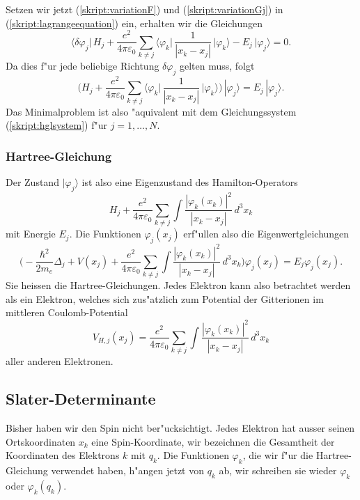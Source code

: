 Setzen wir jetzt (\ref{skript:variationF}) und (\ref{skript:variationGj})
in (\ref{skript:lagrangeequation}) ein, erhalten wir die Gleichungen
\[
\biggl\langle
\delta\varphi_j\biggl|\,
H_j
+
\frac{e^2}{4\pi\varepsilon_0}
\sum_{k\ne j}\biggl\langle\varphi_k\biggl|\,
\frac1{|x_k-x_j|}
\,\biggr|\varphi_k\biggr\rangle-E_j
\,\biggl|\varphi_j \biggr\rangle=0.
\]
Da dies f"ur jede beliebige Richtung $\delta\varphi_j$ gelten muss,
folgt
\begin{equation}
\biggl(
H_j
+
\frac{e^2}{4\pi\varepsilon_0}
\sum_{k\ne j}\biggl\langle\varphi_k\biggl|\,
\frac1{|x_k-x_j|}
\,\biggr|\varphi_k\biggr\rangle\biggr)
\,|\varphi_j \rangle
=
E_j\,|\varphi_j\rangle.
\label{skript:hglsystem}
\end{equation}
Das Minimalproblem ist also "aquivalent mit dem Gleichungssystem
(\ref{skript:hglsystem}) f"ur $j=1,\dots,N$.

\subsubsection{Hartree-Gleichung}
Der Zustand $|\varphi_j\rangle$ ist also eine Eigenzustand des
Hamilton-Operators
\[
H_j
+
\frac{e^2}{4\pi\varepsilon_0}
\sum_{k\ne j}\int \frac{|\varphi_k(x_k)|^2}{|x_k-x_j|}\,d^3x_k
\]
mit Energie $E_j$. Die Funktionen $\varphi_j(x_j)$ erf"ullen also
die Eigenwertgleichungen
\[
\biggl(
-\frac{\hbar^2}{2m_e}\Delta_j
+V(x_j)
+\frac{e^2}{4\pi\varepsilon_0}
\sum_{k\ne j}\int\frac{|\varphi_k(x_k)|^2}{|x_k-x_j|}\,d^3x_k\biggr)\varphi_j(x_j) = E_j\varphi_j(x_j).
\]
Sie heissen die Hartree-Gleichungen.
Jedes Elektron kann also betrachtet
werden als ein Elektron, welches sich zus"atzlich zum Potential der Gitterionen
im mittleren Coulomb-Potential
\[
V_{H,j}(x_j)
=
\frac{e^2}{4\pi\varepsilon_0}
\sum_{k\ne j}\int\frac{|\varphi_k(x_k)|^2}{|x_k-x_j|}\,d^3x_k
\]
aller anderen Elektronen.

\subsection{Slater-Determinante}
Bisher haben wir den Spin nicht ber"ucksichtigt.
Jedes Elektron hat ausser seinen Ortskoordinaten $x_k$ eine Spin-Koordinate,
wir bezeichnen die Gesamtheit der Koordinaten des Elektrons $k$ mit $q_k$.
Die Funktionen $\varphi_k$, die wir f"ur die Hartree-Gleichung verwendet
haben, h"angen jetzt von $q_k$ ab, wir schreiben sie wieder $\varphi_k$ 
oder $\varphi_k(q_k)$.

